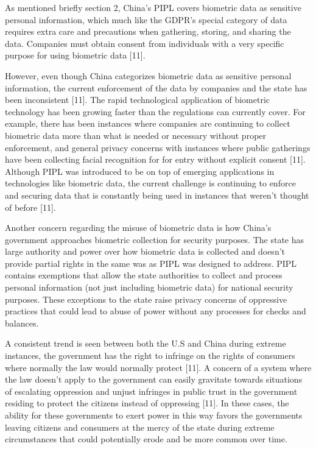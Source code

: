\documentclass[conference]{IEEEtran}
\begin{document}
As mentioned briefly section 2, China's PIPL covers biometric data as sensitive personal information, which much like the GDPR's special category of data requires extra care and precautions when gathering, storing, and sharing the data. Companies must obtain consent from individuals with a very specific purpose for using biometric data [11].

However, even though China categorizes biometric data as sensitive personal information, the current enforcement of the data by companies and the state has been inconsistent [11]. The rapid technological application of biometric technology has been growing faster than the regulations can currently cover. For example, there has been instances where companies are continuing to collect biometric data more than what is needed or necessary without proper enforcement, and general privacy concerns with instances where public gatherings have been collecting facial recognition for for entry without explicit consent [11]. Although PIPL was introduced to be on top of emerging applications in technologies like biometric data, the current challenge is continuing to enforce and securing data that is constantly being used in instances that weren't thought of before [11]. 

Another concern regarding the misuse of biometric data is how China's government approaches biometric collection for security purposes. The state has large authority and power over how biometric data is collected and doesn't provide partial rights in the same was as PIPL was designed to address. PIPL contains exemptions that allow the state authorities to collect and process personal information (not just including biometric data) for national security purposes. These exceptions to the state raise privacy concerns of oppressive practices that could lead to abuse of power without any processes for checks and balances. 

A consistent trend is seen between both the U.S and China during extreme instances, the government has the right to infringe on the rights of consumers where normally the law would normally protect [11]. A concern of a system where the law doesn't apply to the government can easily gravitate towards situations of escalating oppression and unjust infringes in public trust in the government residing to protect the citizens instead of oppressing [11]. In these cases, the ability for these governments to exert power in this way favors the governments leaving citizens and consumers at the mercy of the state during extreme circumstances that could potentially erode and be more common over time. 
\end{document}

